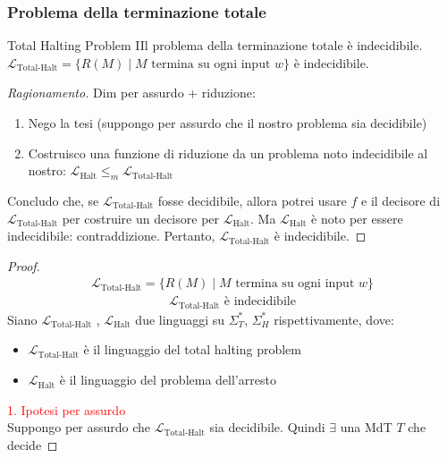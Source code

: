 \documentclass{article}  %
\theoremstyle{definition}
\newenvironment{ragionamento}[1][]
  {\begin{proof}[Ragionamento#1]\renewcommand{\qedsymbol}{}\normalfont}
  {\end{proof}}
\begin{document}
\subsubsection{Problema della terminazione totale}
\begin{theorem}{Total Halting Problem}
	IIl problema della terminazione totale è indecidibile. \\
	$\mathcal{L}_{\text{Total-Halt}} = \{R(M) \mid M \text{ termina su ogni input } w\}$ è indecidibile.
	\footnotesize %
	\begin{ragionamento}
		Dim per assurdo + riduzione:
		\begin{enumerate}
			\item Nego la tesi (suppongo per assurdo che il nostro problema sia decidibile)
			\item Costruisco una funzione di riduzione da un problema noto indecidibile al nostro: $\mathcal{L}_{\text{Halt}} \leq_m \mathcal{L}_{\text{Total-Halt}}$
		\end{enumerate}
		Concludo che, se $\mathcal{L}_{\text{Total-Halt}}$ fosse decidibile, allora potrei usare $f$ e il decisore di $\mathcal{L}_{\text{Total-Halt}}$ per
		costruire un decisore per $\mathcal{L}_{\text{Halt}}$. Ma $\mathcal{L}_{\text{Halt}}$ è noto per essere indecidibile: contraddizione.
		Pertanto, $\mathcal{L}_{\text{Total-Halt}}$ è indecidibile.
	\end{ragionamento}
	\begin{proof}
		\begin{align*}
			\mathcal{L}_{\text{Total-Halt}} = \{R(M) \mid M \text{ termina su ogni input } w\} \tag*{(ipotesi)}
		\end{align*}
		\begin{align*}
			\mathcal{L}_{\text{Total-Halt}} \text{ è indecidibile} \tag*{(tesi)}
		\end{align*}
		Siano $\mathcal{L}_{\text{Total-Halt}}$ , $\mathcal{L}_{\text{Halt}}$ due linguaggi su $\Sigma_T^*$, $\Sigma_H^*$ rispettivamente, dove:
		\begin{itemize}
			\item $\mathcal{L}_{\text{Total-Halt}}$ è il linguaggio del total halting problem
			\item $\mathcal{L}_{\text{Halt}}$ è il linguaggio del problema dell'arresto
		\end{itemize}
		\textcolor{red}{1. Ipotesi per assurdo} \\
		Suppongo per assurdo che $\mathcal{L}_{\text{Total-Halt}}$ sia decidibile. Quindi $\exists$ una MdT $T$ che decide

\end{proof}
\end{theorem}
\end{document}
